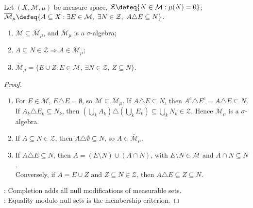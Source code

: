 \begin{proposition} \label{prop:completed-sigma-algebra} \\
Let $(X,\mathcal{M},\mu)$ be measure space, $\mathcal{Z}\defeq\{N\in\mathcal{M}:\mu(N)=0\}$; $\overline{\mathcal{M}}_\mu\defeq\{A\subseteq X:\exists E\in\mathcal{M},\ \exists N\in\mathcal{Z},\ A\triangle E\subseteq N\}$.
\begin{enumerate}[label=(\roman*)]
\setlength{\itemsep}{0pt}
\item $\mathcal{M}\subseteq\overline{\mathcal{M}}_\mu$, and $\overline{\mathcal{M}}_\mu$ is a $\sigma$-algebra;
\item $A\subseteq N\in\mathcal{Z}\Longrightarrow A\in\overline{\mathcal{M}}_\mu$;
\item $\overline{\mathcal{M}}_\mu=\{E\cup Z:E\in\mathcal{M},\ \exists N\in\mathcal{Z},\ Z\subseteq N\}$.
\end{enumerate}
\begin{proof}
\begin{enumerate}[label=(\roman*)]
\setlength{\itemsep}{0pt}
\item For $E\in\mathcal{M}$, $E\triangle E=\emptyset$, so $\mathcal{M}\subseteq\overline{\mathcal{M}}_\mu$. If $A\triangle E\subseteq N$, then $A^c\triangle E^c=A\triangle E\subseteq N$.\\
If $A_k\triangle E_k\subseteq N_k$, then $(\bigcup_kA_k)\triangle(\bigcup_kE_k)\subseteq\bigcup_kN_k\in\mathcal{Z}$. Hence $\overline{\mathcal{M}}_\mu$ is a $\sigma$-algebra.
\item If $A\subseteq N\in\mathcal{Z}$, then $A\triangle\emptyset\subseteq N$, so $A\in\overline{\mathcal{M}}_\mu$.
\item If $A\triangle E\subseteq N$, then $A=(E\setminus N)\cup(A\cap N)$, with $E\setminus N\in\mathcal{M}$ and $A\cap N\subseteq N$.\\
Conversely, if $A=E\cup Z$ and $Z\subseteq N\in\mathcal{Z}$, then $A\triangle E\subseteq Z\subseteq N$.
\end{enumerate}
: Completion adds all null modifications of measurable sets.\\
: Equality modulo null sets is the membership criterion.
\end{proof}
\end{proposition}

